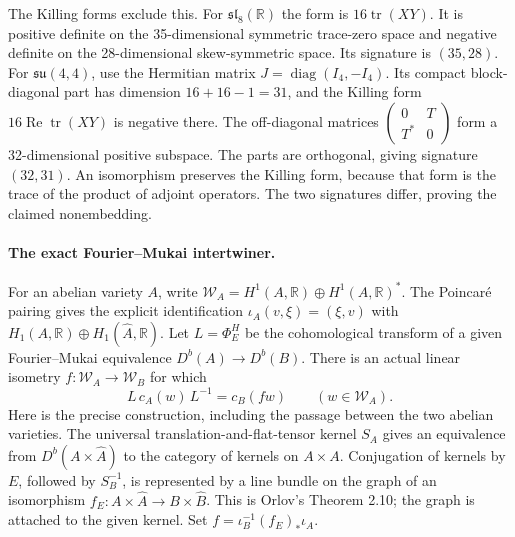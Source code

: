 The Killing forms exclude this. For \(\mathfrak{sl}_8(\mathbb R)\)
the form is \(16\operatorname{tr}(XY)\). It is positive definite
on the 35-dimensional symmetric trace-zero space and negative definite
on the 28-dimensional skew-symmetric space. Its signature is \((35,28)\).
For \(\mathfrak{su}(4,4)\), use the Hermitian matrix
\(J=\operatorname{diag}(I_4,-I_4)\). Its compact block-diagonal
part has dimension \(16+16-1=31\), and the Killing form
\(16\operatorname{Re}\operatorname{tr}(XY)\) is negative there.
The off-diagonal matrices
\(\left(\begin{smallmatrix}0&T\\T^*&0\end{smallmatrix}\right)\)
form a 32-dimensional positive subspace. The parts are orthogonal,
giving signature \((32,31)\). An isomorphism preserves the Killing
form, because that form is the trace of the product of adjoint
operators. The two signatures differ, proving the claimed nonembedding.

\paragraph{The exact Fourier--Mukai intertwiner.}
For an abelian variety \(A\), write
\(\mathcal W_A=H^1(A,\mathbb R)\oplus H^1(A,\mathbb R)^*\).
The Poincar\'e pairing gives the explicit identification
\(\iota_A(v,\xi)=(\xi,v)\) with
\(H_1(A,\mathbb R)\oplus H_1(\widehat A,\mathbb R)\).
Let \(L=\Phi_E^H\) be the cohomological transform of a
given Fourier--Mukai equivalence \(D^b(A)\to D^b(B)\).
There is an actual linear isometry \(f:\mathcal W_A\to\mathcal W_B\)
for which
\begin{equation}\label{eq:G19-Clifford-intertwiner}
        L\,c_A(w)\,L^{-1}=c_B(fw)\qquad(w\in\mathcal W_A).
\end{equation}
Here is the precise construction, including the passage between the
two abelian varieties. The universal translation-and-flat-tensor kernel
\(S_A\) gives an equivalence from \(D^b(A\times\widehat A)\)
to the category of kernels on \(A\times A\). Conjugation of kernels
by \(E\), followed by \(S_B^{-1}\), is represented by a line bundle
on the graph of an isomorphism
\(f_E:A\times\widehat A\to B\times\widehat B\).
This is Orlov's Theorem 2.10; the graph is attached to the given kernel.
Set \(f=\iota_B^{-1}(f_E)_*\iota_A\).


